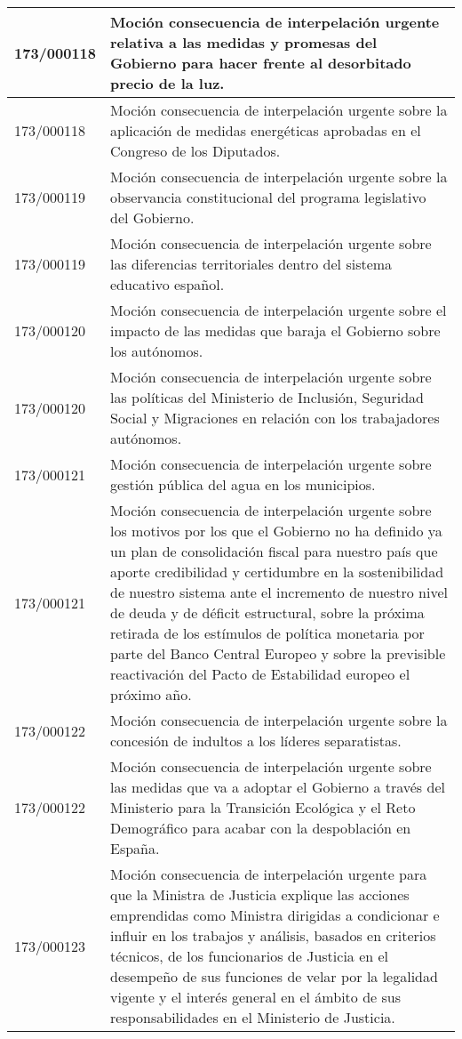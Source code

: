 {\begin{table}[H]
\begin{center}
\begin{tabularx}{\linewidth}{| l | X |}
\hline
173/000118 & Moción consecuencia de interpelación urgente relativa a las medidas y promesas del Gobierno para hacer frente al desorbitado precio de la luz. \\
\hline
173/000118 & Moción consecuencia de interpelación urgente sobre la aplicación de medidas energéticas aprobadas en el Congreso de los Diputados. \\
\hline
173/000119 & Moción consecuencia de interpelación urgente sobre la observancia constitucional del programa legislativo del Gobierno. \\
\hline
173/000119 & Moción consecuencia de interpelación urgente sobre las diferencias territoriales dentro del sistema educativo español. \\
\hline
173/000120 & Moción consecuencia de interpelación urgente sobre el impacto de las medidas que baraja el Gobierno sobre los autónomos. \\
\hline
173/000120 & Moción consecuencia de interpelación urgente sobre las políticas del Ministerio de Inclusión, Seguridad Social y Migraciones en relación con los trabajadores autónomos. \\
\hline
173/000121 & Moción consecuencia de interpelación urgente sobre gestión pública del agua en los municipios. \\
\hline
173/000121 & Moción consecuencia de interpelación urgente sobre los motivos por los que el Gobierno no ha definido ya un plan de consolidación fiscal para nuestro país que aporte credibilidad y certidumbre en la sostenibilidad de nuestro sistema ante el incremento de nuestro nivel de deuda y de déficit estructural, sobre la próxima retirada de los estímulos de política monetaria por parte del Banco Central Europeo y sobre la previsible reactivación del Pacto de Estabilidad europeo el próximo año. \\
\hline
173/000122 & Moción consecuencia de interpelación urgente sobre la concesión de indultos a los líderes separatistas. \\
\hline
173/000122 & Moción consecuencia de interpelación urgente sobre las medidas que va a adoptar el Gobierno a través del Ministerio para la Transición Ecológica y el Reto Demográfico para acabar con la despoblación en España. \\
\hline
173/000123 & Moción consecuencia de interpelación urgente para que la Ministra de Justicia explique las acciones emprendidas como Ministra dirigidas a condicionar e influir en los trabajos y análisis, basados en criterios técnicos, de los funcionarios de Justicia en el desempeño de sus funciones de velar por la legalidad vigente y el interés general en el ámbito de sus responsabilidades en el Ministerio de Justicia. \\

\end{tabularx}
\end{center}
\end{table}}
